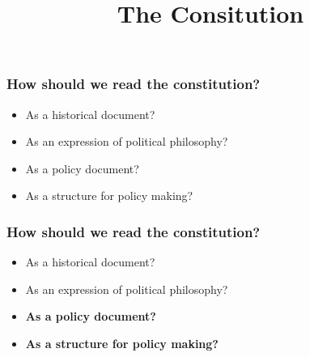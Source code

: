 \documentclass[aspectratio=169]{beamer}
\title{The Consitution}
\date{}
\theoremstyle{principle}
\begin{document}


{
  \begin{frame}[plain]
  

  \end{frame}
}

\begin{frame}
\frametitle{How should we read the constitution?}

\begin{itemize}
\item As a historical document?
\bigskip
\bigskip
\item As an expression of political philosophy?
\bigskip
\bigskip
\item As a policy document?
\bigskip
\bigskip
\item As a structure for policy making?
\end{itemize}
\end{frame}

\begin{frame}
\frametitle{How should we read the constitution?}

\begin{itemize}
\item As a historical document?
\bigskip
\bigskip
\item As an expression of political philosophy?
\bigskip
\bigskip
\item \textbf{As a policy document?}
\bigskip
\bigskip
\item \textbf{As a structure for policy making?}
\end{itemize}
\end{frame}
\end{document}
